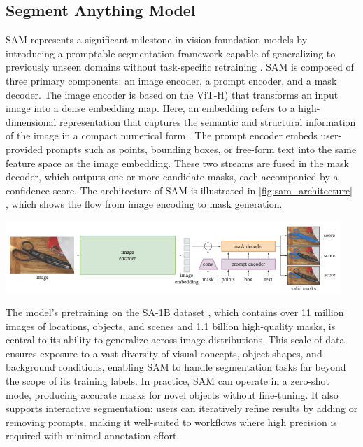 \subsection{Segment Anything Model}
\gls{SAM} represents a significant milestone in vision foundation models by introducing a promptable segmentation framework capable of generalizing to previously unseen domains without task-specific retraining \cite{Kirillov_2023}. \gls{SAM} is composed of three primary components: an image encoder, a prompt encoder, and a mask decoder. The image encoder is based on the \gls{ViT}-H) that transforms an input image into a dense embedding map. Here, an embedding refers to a high-dimensional representation that captures the semantic and structural information of the image in a compact numerical form \cite{Frome_2013}. The prompt encoder embeds user-provided prompts such as points, bounding boxes, or free-form text into the same feature space as the image embedding. These two streams are fused in the mask decoder, which outputs one or more candidate masks, each accompanied by a confidence score. The architecture of \gls{SAM} is illustrated in \autoref{fig:sam_architecture} \cite{Kirillov_2023}, which shows the flow from image encoding to mask generation.

\begin{center}
    \includegraphics[width=0.95\textwidth]{figures/12_SAM.png} 
    \label{fig:sam_architecture}
\end{center}


The model’s pretraining on the SA-1B dataset \cite{SA1B_2023}, which contains over 11 million images of locations, objects, and scenes and 1.1 billion high-quality masks, is central to its ability to generalize across image distributions. This scale of data ensures exposure to a vast diversity of visual concepts, object shapes, and background conditions, enabling \gls{SAM} to handle segmentation tasks far beyond the scope of its training labels. In practice, \gls{SAM} can operate in a zero-shot mode, producing accurate masks for novel objects without fine-tuning. It also supports interactive segmentation: users can iteratively refine results by adding or removing prompts, making it well-suited to workflows where high precision is required with minimal annotation effort.

